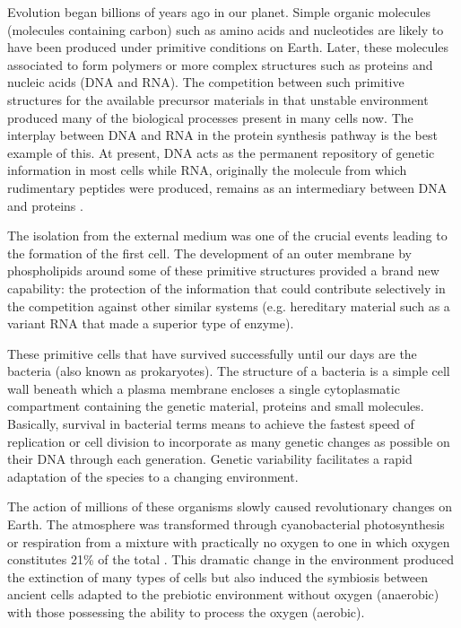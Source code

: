 Evolution began billions of years ago in our planet. Simple organic molecules (molecules 
containing carbon) such as amino acids and nucleotides are likely to have been produced 
under primitive conditions on Earth. Later, these molecules associated to form polymers 
or more complex structures such as proteins and nucleic acids (DNA and RNA). 
The competition between such primitive structures for the available precursor materials in that unstable 
environment produced many of the biological processes present in many cells now. The 
interplay between DNA and RNA in the protein synthesis pathway is the best example of this. 
At present, DNA acts as the permanent repository of genetic information in most cells while RNA, 
originally the molecule from which rudimentary peptides were produced, remains as an intermediary 
between DNA and proteins \citep{alberts:1994a}.%

The isolation from the external medium was one of the crucial events leading to the formation
of the first cell. The development of an outer membrane by phospholipids around some of these 
primitive structures provided a brand new capability: the protection of the information that 
could contribute selectively in the competition against other similar systems (e.g. hereditary 
material such as a variant RNA that made a superior type of enzyme).%

%
These primitive cells that have survived successfully until our days are the bacteria (also known
as prokaryotes). 
%
The structure of a bacteria is a simple cell wall beneath which a plasma membrane
encloses a single cytoplasmatic compartment containing the genetic material, proteins and small 
molecules. Basically, survival in bacterial terms means to achieve the fastest speed of replication 
or cell division to incorporate as many genetic changes as possible on their DNA through each 
generation. Genetic variability facilitates a rapid adaptation of the species to a changing 
environment.

The action of millions of these organisms slowly caused revolutionary changes on Earth. 
The atmosphere was transformed through cyanobacterial photosynthesis or respiration from a 
mixture with practically no oxygen to one in which oxygen constitutes 21\% of the 
total \citep{alberts:1994a}. This dramatic change in the environment produced the extinction 
of many types of cells but also induced the symbiosis between ancient cells adapted to the 
prebiotic environment without oxygen (anaerobic) with those possessing the ability to process 
the oxygen (aerobic). 

